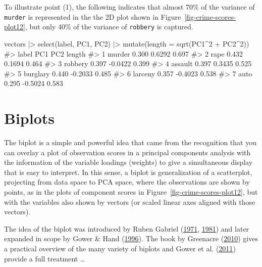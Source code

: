 \documentclass[
  letterpaper,
  10pt,
  krantz2]{krantz}
\makeatletter
\newenvironment{Shaded}{\begin{snugshade}}{\end{snugshade}}
\newcommand{\AttributeTok}[1]{\textcolor[rgb]{0.40,0.45,0.13}{#1}}
\newcommand{\CommentTok}[1]{\textcolor[rgb]{0.37,0.37,0.37}{#1}}
\newcommand{\DecValTok}[1]{\textcolor[rgb]{0.68,0.00,0.00}{#1}}
\newcommand{\FunctionTok}[1]{\textcolor[rgb]{0.28,0.35,0.67}{#1}}
\newcommand{\NormalTok}[1]{\textcolor[rgb]{0.00,0.23,0.31}{#1}}
\newcommand{\SpecialCharTok}[1]{\textcolor[rgb]{0.37,0.37,0.37}{#1}}
\newenvironment{kframe}{%
  \medskip{}
  \setlength{\fboxsep}{.8em}
  \def\at@end@of@kframe{}%
  \ifinner\ifhmode%
  \def\at@end@of@kframe{\end{minipage}}%
  \begin{minipage}{\columnwidth}%
  \fi\fi%
  \def\FrameCommand##1{\hskip\@totalleftmargin \hskip-\fboxsep
  \colorbox{shadecolor}{##1}\hskip-\fboxsep
      \hskip-\linewidth \hskip-\@totalleftmargin \hskip\columnwidth}%
  \MakeFramed {\advance\hsize-\width
    \@totalleftmargin\z@ \linewidth\hsize
    \@setminipage}}%
{\par\unskip\endMakeFramed%
  \at@end@of@kframe}
\renewenvironment{Shaded}{\begin{kframe}}{\end{kframe}}
\makeatother
\begin{document}
To illustrate point (1), the following indicates that almost 70\% of the
variance of \texttt{murder} is represented in the the 2D plot shown in
Figure~\ref{fig-crime-scores-plot12}, but only 40\% of the variance of
\texttt{robbery} is captured.

\begin{Shaded}
\begin{Highlighting}[]
\NormalTok{vectors }\SpecialCharTok{|\textgreater{}} \FunctionTok{select}\NormalTok{(label, PC1, PC2) }\SpecialCharTok{|\textgreater{}} 
  \FunctionTok{mutate}\NormalTok{(}\AttributeTok{length =} \FunctionTok{sqrt}\NormalTok{(PC1}\SpecialCharTok{\^{}}\DecValTok{2} \SpecialCharTok{+}\NormalTok{ PC2}\SpecialCharTok{\^{}}\DecValTok{2}\NormalTok{))}
\CommentTok{\#\textgreater{}      label   PC1     PC2 length}
\CommentTok{\#\textgreater{} 1   murder 0.300  0.6292  0.697}
\CommentTok{\#\textgreater{} 2     rape 0.432  0.1694  0.464}
\CommentTok{\#\textgreater{} 3  robbery 0.397 {-}0.0422  0.399}
\CommentTok{\#\textgreater{} 4  assault 0.397  0.3435  0.525}
\CommentTok{\#\textgreater{} 5 burglary 0.440 {-}0.2033  0.485}
\CommentTok{\#\textgreater{} 6  larceny 0.357 {-}0.4023  0.538}
\CommentTok{\#\textgreater{} 7     auto 0.295 {-}0.5024  0.583}
\end{Highlighting}
\end{Shaded}

\hypertarget{sec-biplot}{%
\section{Biplots}\label{sec-biplot}}

The biplot is a simple and powerful idea that came from the recognition
that you can overlay a plot of observation scores in a principal
components analysis with the information of the variable loadings
(weights) to give a simultaneous display that is easy to interpret. In
this sense, a biplot is generalization of a scatterplot, projecting from
data space to PCA space, where the observations are shown by points, as
in the plots of component scores in
Figure~\ref{fig-crime-scores-plot12}, but with the variables also shown
by vectors (or scaled linear axes aligned with those vectors).

The idea of the biplot was introduced by Ruben Gabriel
(\protect\hyperlink{ref-Gabriel:71}{1971},
\protect\hyperlink{ref-Gabriel:81}{1981}) and later expanded in scope by
Gower \& Hand (\protect\hyperlink{ref-GowerHand:96}{1996}). The book by
Greenacre (\protect\hyperlink{ref-Greenacre:2010:biplots}{2010}) gives a
practical overview of the many variety of biplots and Gower et al.
(\protect\hyperlink{ref-Gower-etal:2011}{2011}) provide a full treatment
\ldots{}
\end{document}
